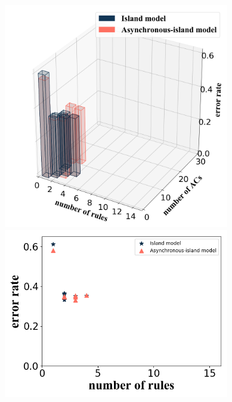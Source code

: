 \documentclass[conference]{IEEEtran}
\begin{document}
\begin{figure}[H]
    \centering
    \begin{minipage}[t]{0.40\textwidth}
    \includegraphics[width=0.88\textwidth]{figures/diffModelTest1.png}
    \end{minipage}
    \centering
    \begin{minipage}[t]{0.25\textwidth}
    \includegraphics[width=0.88\textwidth]{figures/diffModelTest2.png}
    \end{minipage}%
    \centering
    \begin{minipage}[t]{0.25\textwidth}

\end{minipage}
\end{figure}
\end{document}
